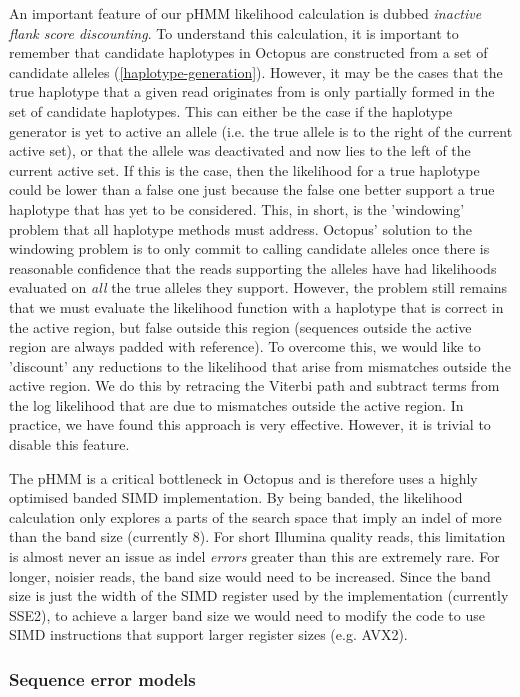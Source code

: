 \documentclass{article}
\begin{document}
An important feature of our pHMM likelihood calculation is dubbed \emph{inactive flank score discounting}. To understand this calculation, it is important to remember that candidate haplotypes in Octopus are constructed from a set of candidate alleles (\ref{haplotype-generation}). However, it may be the cases that the true haplotype that a given read originates from is only partially formed in the set of candidate haplotypes. This can either be the case if the haplotype generator is yet to active an allele (i.e. the true allele is to the right of the current active set), or that the allele was deactivated and now lies to the left of the current active set. If this is the case, then the likelihood for a true haplotype could be lower than a false one just because the false one better support a true haplotype that has yet to be considered. This, in short, is the 'windowing' problem that all haplotype methods must address. Octopus' solution to the windowing problem is to only commit to calling candidate alleles once there is reasonable confidence that the reads supporting the alleles have had likelihoods evaluated on \emph{all} the true alleles they support. However, the problem still remains that we must evaluate the likelihood function with a haplotype that is correct in the active region, but false outside this region (sequences outside the active region are always padded with reference). To overcome this, we would like to 'discount' any reductions to the likelihood that arise from mismatches outside the active region. We do this by retracing the Viterbi path and subtract terms from the log likelihood that are due to mismatches outside the active region. In practice, we have found this approach is very effective. However, it is trivial to disable this feature.

The pHMM is a critical bottleneck in Octopus and is therefore uses a highly optimised banded SIMD implementation. By being banded, the likelihood calculation only explores a parts of the search space that imply an indel of more than the band size (currently 8). For short Illumina quality reads, this limitation is almost never an issue as indel \emph{errors} greater than this are extremely rare. For longer, noisier reads, the band size would need to be increased. Since the band size is just the width of the SIMD register used by the implementation (currently SSE2), to achieve a larger band size we would need to modify the code to use SIMD instructions that support larger register sizes (e.g. AVX2).

\subsubsection{Sequence error models}
\end{document}
